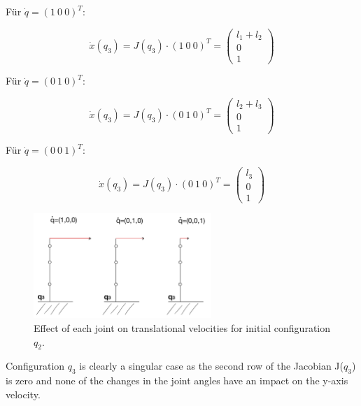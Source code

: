Für $\dot{q}=(1\ 0\ 0)^T$:

\begin{equation}
    \dot{x}(q_3)=J(q_3)\cdot (1\ 0\ 0)^T = \begin{pmatrix} 
  l_1+ l_2\\
  0\\
  1\end{pmatrix}
\end{equation}

Für $\dot{q}=(0\ 1\ 0)^T$:

\begin{equation}
    \dot{x}(q_3)=J(q_3)\cdot (0\ 1\ 0)^T = \begin{pmatrix} 
  l_2+l_3\\
  0\\
  1\end{pmatrix}
\end{equation}

Für $\dot{q}=(0\ 0\ 1)^T$:

\begin{equation}
    \dot{x}(q_3)=J(q_3)\cdot (0\ 1\ 0)^T = \begin{pmatrix} 
  l_3\\
  0\\
  1\end{pmatrix}
\end{equation}

\begin{figure} [H]
   \begin{center}
        \includegraphics[width=0.6\textwidth]{SRC/q_3_joints.JPEG}
   \end{center}
  \caption{Effect of each joint on translational velocities for initial configuration $q_2$.}
  \label{fig:q3}
\end{figure}

Configuration $q_3$ is clearly a singular case as the second row of the Jacobian J($q_3$) is zero and none of the changes in the joint angles have an impact on the y-axis velocity. 